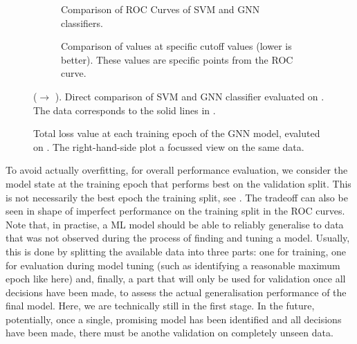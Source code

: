\documentclass[
	fontsize=10pt, %
	twoside=false, %
	secnumdepth=1, %
  toc=indentunnumbered %
]{kaobook}
\begin{document}




\begin{figure}[h]
  \centering
  \begin{subfigure}[h]{0.49\linewidth}
    \caption{Comparison of ROC Curves of SVM and GNN classifiers.}
  \end{subfigure}
  \begin{subfigure}[h]{0.49\linewidth}
    \caption{Comparison of \FPR values at specific \TPR cutoff values (lower is better). These
      values are specific points from the ROC curve.}
  \end{subfigure}
  \caption{(\ADMap $\rightarrow$ \ReconMap).
    Direct comparison of SVM and GNN classifier evaluated on \ReconMap. The data
    corresponds to the solid lines in .}
  \label{fig:svm-repro-reconmapolder-roc-train-test}
\end{figure}
\begin{figure}[h]
  \centering
  \begin{subfigure}[h]{0.49\linewidth}
  \end{subfigure}
  \begin{subfigure}[h]{0.49\linewidth}
  \end{subfigure}
  \caption{Total loss value at each training epoch of the GNN model, evaluted on
    \ReconMap. The right-hand-side plot a focussed view on the same data.}
  \label{fig:svm-repro-reconmapolder-loss}
\end{figure}

To avoid actually overfitting, for overall performance evaluation, we consider
the model state at the training epoch that performs best on the validation
split. This is not necessarily the best epoch \wrt the training split, see
. The tradeoff can also be seen in shape of imperfect
performance on the training split in the ROC curves.
% 
%
Note that, in practise, a ML model should be able to reliably generalise to data
that was not observed during the process of finding and tuning a model. Usually,
this is done by splitting the available data into three parts: one for training,
one for evaluation during model tuning (such as identifying a reasonable maximum
epoch like here) and, finally, a part that will only be used for validation once
all decisions have been made, to assess the actual generalisation performance of
the final model.
%
Here, we are technically still in the first stage. In the future, potentially,
once a single, promising model has been identified and all decisions have been
made, there must be anothe validation on completely unseen data.
\end{document}
